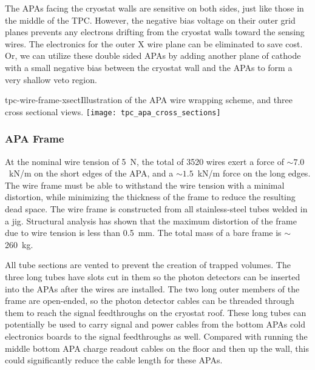 The APAs facing the cryostat walls are sensitive on both sides, just like those in the middle of the TPC.  However, the negative bias voltage on their outer grid planes prevents any electrons drifting from the cryostat walls toward the sensing wires.  The electronics for the outer X wire plane can be eliminated to save cost.  Or, we can utilize these double sided APAs by adding another plane of cathode with a small negative bias between the cryostat wall and the APAs to form a very shallow veto region.  

\begin{cdrfigure}{tpc-wire-frame-xsect}{Illustration of the APA wire wrapping scheme, and three cross sectional views.}
\texttt{[image: tpc\_apa\_cross\_sections]}
\end{cdrfigure}



\subsubsection{APA Frame}
\label{subsec:fd-ref-apaframes}

At the nominal wire tension of 5~N, the total of 3520 wires exert a force of 
$\sim 7.0$~kN/m on the short edges of the APA, and a 
$\sim 1.5 $~kN/m force on the long edges. The wire 
frame must be able to withstand the wire tension with a minimal 
distortion, while minimizing the thickness of the 
frame to reduce the resulting dead space. The wire frame is constructed from all stainless-steel tubes welded in a jig.  
Structural analysis has shown that the maximum distortion of the frame due to wire tension is less than 0.5~mm. The total mass of a bare frame is $\sim$260~kg.


All tube sections are vented to prevent the creation of trapped volumes. The three long tubes have slots cut in them so the photon detectors can be inserted into the APAs after the wires are installed.  The two long outer members of the frame are open-ended, so the photon detector cables can be threaded through them to reach the signal feedthroughs on the cryostat roof.  These long tubes can potentially be used to carry signal and power cables from the bottom APAs cold electronics boards to the signal feedthroughs as well.  Compared with running the middle bottom APA charge readout cables on the floor and then up the wall, this could significantly reduce the cable length for these APAs.


